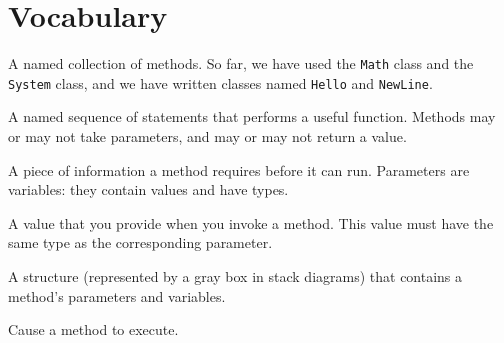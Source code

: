 \section{Vocabulary}

\begin{description}

A named collection of methods.
So far, we have used the {\tt Math} class and the {\tt System} class, and we have written classes named {\tt Hello} and {\tt NewLine}.

A named sequence of statements that performs a useful function.
Methods may or may not take parameters, and may or may not return a value.

A piece of information a method requires before it can run.
Parameters are variables: they contain values and have types.

A value that you provide when you invoke a method.
This value must have the same type as the corresponding parameter.

A structure (represented by a gray box in stack diagrams) that contains a method's parameters and variables.

Cause a method to execute.

\end{description}
